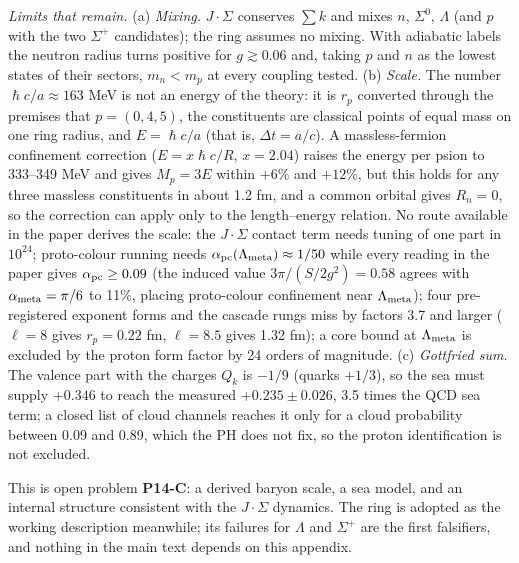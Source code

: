 \documentclass[11pt,letterpaper]{article}
\begin{document}
\noindent \emph{Limits that remain.} (a) \emph{Mixing.} $J\!\cdot\!\Sigma$ conserves $\sum k$ and mixes $n$, $\Sigma^0$, $\Lambda$ (and $p$ with the two $\Sigma^+$ candidates); the ring assumes no mixing. With adiabatic labels the neutron radius turns positive for $g\gtrsim0.06$ and, taking $p$ and $n$ as the lowest states of their sectors, $m_n<m_p$ at every coupling tested. (b) \emph{Scale.} The number $\hslash c/a\approx163$ MeV is not an energy of the theory: it is $r_p$ converted through the premises that $p=(0,4,5)$, the constituents are classical points of equal mass on one ring radius, and $E=\hslash c/a$ (that is, $\Delta t=a/c$). A massless-fermion confinement correction ($E=x\hslash c/R$, $x=2.04$) raises the energy per psion to 333--349 MeV and gives $M_p=3E$ within $+6\%$ and $+12\%$, but this holds for any three massless constituents in about 1.2 fm, and a common orbital gives $R_n=0$, so the correction can apply only to the length--energy relation. No route available in the paper derives the scale: the $J\!\cdot\!\Sigma$ contact term needs tuning of one part in $10^{24}$; proto-colour running needs $\alpha_{\rm pc}(\Lambda_{\rm meta})\approx1/50$ while every reading in the paper gives $\alpha_{\rm pc}\ge0.09$ (the induced value $3\pi/(S/2g^2)=0.58$ agrees with $\alpha_{\rm meta}=\pi/6$ to 11\%, placing proto-colour confinement near $\Lambda_{\rm meta}$); four pre-registered exponent forms and the cascade rungs miss by factors 3.7 and larger ($\ell=8$ gives $r_p=0.22$ fm, $\ell=8.5$ gives 1.32 fm); a core bound at $\Lambda_{\rm meta}$ is excluded by the proton form factor by 24 orders of magnitude. (c) \emph{Gottfried sum.} The valence part with the charges $Q_k$ is $-1/9$ (quarks $+1/3$), so the sea must supply $+0.346$ to reach the measured $+0.235\pm0.026$, 3.5 times the QCD sea term; a closed list of cloud channels reaches it only for a cloud probability between 0.09 and 0.89, which the PH does not fix, so the proton identification is not excluded.

\noindent This is open problem \textbf{P14-C}: a derived baryon scale, a sea model, and an internal structure consistent with the $J\!\cdot\!\Sigma$ dynamics. The ring is adopted as the working description meanwhile; its failures for $\Lambda$ and $\Sigma^+$ are the first falsifiers, and nothing in the main text depends on this appendix.
\end{document}
